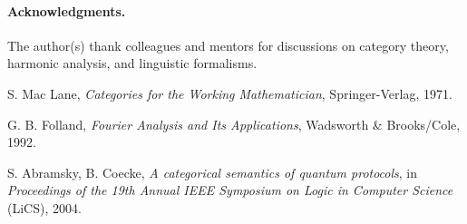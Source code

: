 \documentclass[11pt]{article}
\begin{document}
\paragraph{Acknowledgments.} 
The author(s) thank colleagues and mentors for discussions on category theory, harmonic analysis, and linguistic formalisms.


\begin{thebibliography}{9}

S. Mac Lane, 
\textit{Categories for the Working Mathematician}, 
Springer-Verlag, 1971.

G. B. Folland, 
\textit{Fourier Analysis and Its Applications}, 
Wadsworth \& Brooks/Cole, 1992.

S. Abramsky, B. Coecke,
\textit{A categorical semantics of quantum protocols},
in \textit{Proceedings of the 19th Annual IEEE Symposium on Logic in Computer Science} (LiCS), 2004.

\end{thebibliography}
\end{document}
